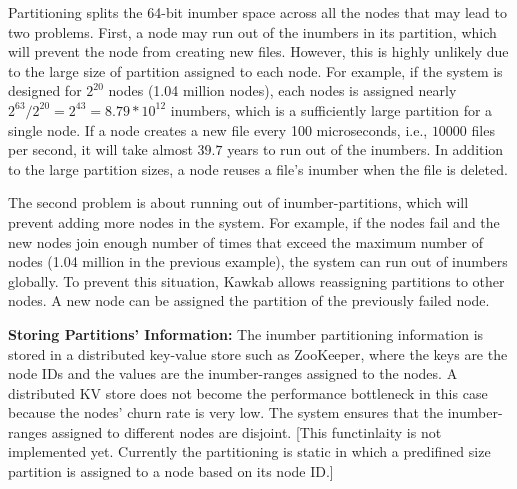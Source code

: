 \documentclass[]{article}
\newcommand{\subtopic}[1]{\vspace{1.5pt} \noindent \textbf{#1}}
\begin{document}
Partitioning splits the 64-bit inumber space across all the nodes that may lead to
two problems. First, a node may run out of the inumbers in its partition, which
will prevent the node from creating new files.  However, this is highly
unlikely due to the large size of partition assigned to each node. For example, if
the system is designed for $2^{20}$ nodes (1.04 million nodes), each nodes is
assigned nearly $2^{63} / 2^{20} = 2^{43} = 8.79 * 10^{12}$ inumbers, which is a
sufficiently large partition for a single node. If a node creates a new file
every 100 microseconds, i.e., $10000$ files per second, it will take almost
$39.7$ years to run out of the inumbers. In addition to the large partition
sizes, a node reuses a file's inumber when the file is deleted.

The second problem is about running out of inumber-partitions, which will
prevent adding more nodes in the system. For example, if the nodes fail and the
new nodes join enough number of times that exceed the maximum number of nodes
(1.04 million in the previous example), the system can run out of inumbers
globally. To prevent this situation, Kawkab allows reassigning partitions to
other nodes. A new node can be assigned the partition of the previously failed
node.


\subtopic{Storing Partitions' Information:} The inumber partitioning
information is stored in a distributed key-value store such as ZooKeeper, where
the keys are the node IDs and the values are the inumber-ranges assigned to the
nodes.  A distributed KV store does not become the performance bottleneck in
this case because the nodes' churn rate is very low.  The system ensures that
the inumber-ranges assigned to different nodes are disjoint. [This functinlaity
is not implemented yet. Currently the partitioning is static in which a 
predifined size partition is assigned to a node based on its node ID.]




%
\end{document}
